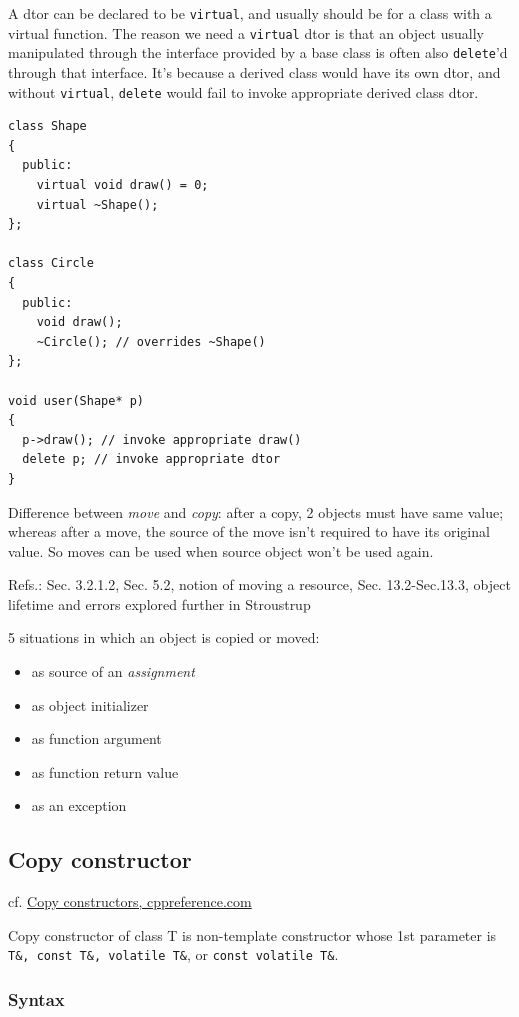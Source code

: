 \documentclass[10pt]{amsart}
\begin{document}
\begin{multicols*}{2}
A dtor can be declared to be \verb|virtual|, and usually should be for a class with a virtual function. The reason we need a \verb|virtual| dtor is that an object usually manipulated through the interface provided by a base class is often also \verb|delete|'d through that interface. It's because a derived class would have its own dtor, and without \verb|virtual|, \verb|delete| would fail to invoke appropriate derived class dtor.

\begin{lstlisting}
class Shape
{
  public:
    virtual void draw() = 0;
    virtual ~Shape();
};

class Circle
{
  public:
	void draw();
	~Circle(); // overrides ~Shape()
};

void user(Shape* p)
{
  p->draw(); // invoke appropriate draw()
  delete p; // invoke appropriate dtor
}
\end{lstlisting}


Difference between \emph{move} and \emph{copy}: after a copy, 2 objects must have same value; whereas after a move, the source of the move isn't required to have its original value.  So moves can be used when source object won't be used again.  

Refs.: Sec. 3.2.1.2, Sec. 5.2, notion of moving a resource, Sec. 13.2-Sec.13.3, object lifetime and errors explored further in Stroustrup \cite{Stro2013}  
  
  
5 situations in which an object is copied or moved:   
\begin{itemize}
	\item as source of an \emph{assignment}
	\item as object initializer 
	\item as function argument
	\item as function return value
	\item as an exception  
\end{itemize}


\subsection{Copy constructor}

cf. \href{http://en.cppreference.com/w/cpp/language/copy_constructor}{Copy constructors, cppreference.com}

Copy constructor of class T is non-template constructor whose 1st parameter is \verb|T&, const T&, volatile T&|, or \verb|const volatile T&|.  

\subsubsection{Syntax}  


\end{multicols*}
\end{document}
